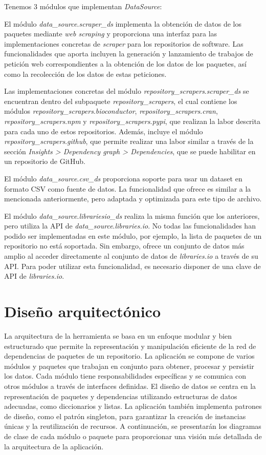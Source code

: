 Tenemos 3 módulos que implementan \textit{DataSource}:

El módulo \textit{data\_source}.\textit{scraper\_ds} implementa la obtención de datos de los paquetes 
mediante \textit{web scraping} y proporciona una interfaz para las implementaciones concretas
 de \textit{scraper} para los repositorios de software. Las funcionalidades que aporta incluyen 
 la generación y lanzamiento de trabajos de petición web correspondientes a la obtención de los datos 
 de los paquetes, así como la recolección de los datos de estas peticiones.

Las implementaciones concretas del módulo \textit{repository\_scrapers}.\textit{scraper\_ds} se encuentran 
dentro del subpaquete \textit{repository\_scrapers}, el cual contiene los módulos \textit{repository\_scrapers}.\textit{bioconductor},
\textit{repository\_scrapers}.\textit{cran}, \textit{repository\_scrapers}.\textit{npm} 
y \textit{repository\_scrapers}.\textit{pypi}, que realizan la labor descrita para cada uno de 
estos repositorios. Además, incluye el módulo \textit{repository\_scrapers}.\textit{github}, que permite 
realizar una labor similar a través de la sección \textit{Insights > Dependency graph > Dependencies}, que se puede 
habilitar en un repositorio de GitHub.

El módulo \textit{data\_source}.\textit{csv\_ds} proporciona soporte para usar un dataset en formato CSV como fuente de 
datos. La funcionalidad que ofrece es similar a la mencionada anteriormente, pero adaptada y optimizada 
para este tipo de archivo.

El módulo \textit{data\_source}.\textit{librariesio\_ds} realiza la misma función que los anteriores, pero utiliza la 
API de \textit{data\_source}.\textit{libraries.io}. No todas las funcionalidades han podido ser implementadas en este 
módulo, por ejemplo, la lista de paquetes de un repositorio no está soportada. Sin embargo, ofrece 
un conjunto de datos más amplio al acceder directamente al conjunto de datos de \textit{libraries.io} 
a través de su API. Para poder utilizar esta funcionalidad, es necesario disponer de una clave de API 
de \textit{libraries.io}.

\section{Diseño arquitectónico}

La arquitectura de la herramienta se basa en un enfoque modular y bien estructurado que permite la 
representación y manipulación eficiente de la red de dependencias de paquetes de un repositorio. La aplicación se 
compone de varios módulos y paquetes que trabajan en conjunto para obtener, procesar y persistir los datos. 
Cada módulo tiene responsabilidades específicas y se comunica con otros módulos a través de interfaces definidas. 
El diseño de datos se centra en la representación de paquetes y dependencias utilizando estructuras de datos 
adecuadas, como diccionarios y listas. La aplicación también implementa patrones de diseño, como el patrón singleton, 
para garantizar la creación de instancias únicas y la reutilización de recursos. A continuación, se presentarán 
los diagramas de clase de cada módulo o paquete para proporcionar una visión más detallada de la arquitectura de 
la aplicación.